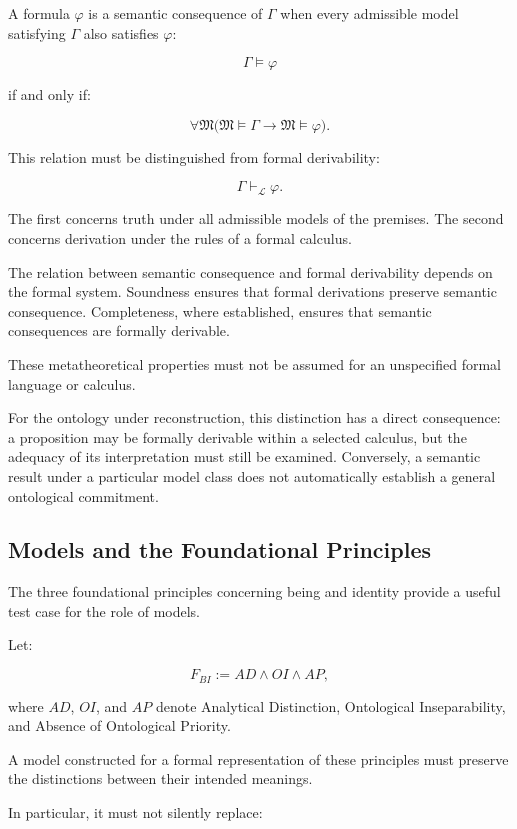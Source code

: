 A formula \(\varphi\) is a semantic consequence of
\(\Gamma\) when every admissible model satisfying
\(\Gamma\) also satisfies \(\varphi\):

\[
    \Gamma \models \varphi
\]

if and only if:

\[
    \forall \mathfrak{M}
    \bigl(
        \mathfrak{M} \models \Gamma
        \rightarrow
        \mathfrak{M} \models \varphi
    \bigr).
\]

This relation must be distinguished from formal
derivability:

\[
    \Gamma \vdash_{\mathcal{L}} \varphi.
\]

The first concerns truth under all admissible models
of the premises. The second concerns derivation under
the rules of a formal calculus.

The relation between semantic consequence and formal
derivability depends on the formal system. Soundness
ensures that formal derivations preserve semantic
consequence. Completeness, where established, ensures
that semantic consequences are formally derivable.

These metatheoretical properties must not be assumed
for an unspecified formal language or calculus.

For the ontology under reconstruction, this distinction
has a direct consequence: a proposition may be
formally derivable within a selected calculus, but
the adequacy of its interpretation must still be
examined. Conversely, a semantic result under a
particular model class does not automatically establish
a general ontological commitment.

\subsection{Models and the Foundational Principles}

The three foundational principles concerning being
and identity provide a useful test case for the role
of models.

Let:

\[
    F_{BI} := AD \land OI \land AP,
\]

where \(AD\), \(OI\), and \(AP\) denote Analytical
Distinction, Ontological Inseparability, and Absence
of Ontological Priority.

A model constructed for a formal representation of
these principles must preserve the distinctions
between their intended meanings.

In particular, it must not silently replace:

